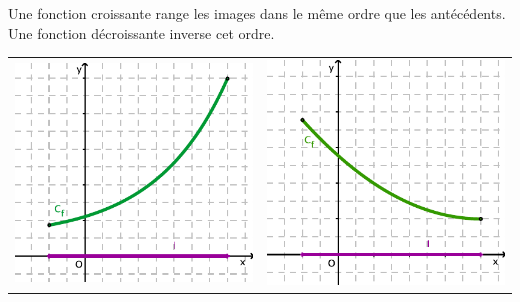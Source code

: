 \smallskip

\begin{rem}
  \begin{minipage}[t]{0.8\linewidth}
    Une fonction croissante range les images dans le même ordre que
    les antécédents. \\
    Une fonction décroissante inverse cet ordre. \\
  \end{minipage}
\end{rem}

\begin{center}
  \begin{tabular}{c@{\qquad \qquad}c}
    \begin{minipage}[c]{0.36\linewidth}
      \includegraphics[width=\textwidth]{F_Croissante.pdf}
    \end{minipage}
    &
    \begin{minipage}[c]{0.36\linewidth}
      \includegraphics[width=\textwidth]{F_Decroissante.pdf}

\end{minipage}
\end{tabular}
\end{center}

